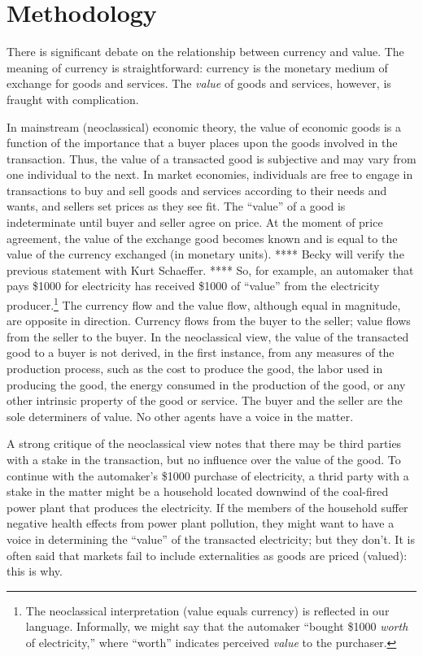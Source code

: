 \section{Methodology}

There is significant debate on the relationship between currency and value. 
The meaning of currency is straightforward: currency is the 
monetary medium of exchange for goods and services. 
The \emph{value} of goods and services, however, 
is fraught with complication.

In mainstream (neoclassical) economic theory,
the value of economic goods is a function of
the importance that a buyer places upon the goods 
involved in the transaction.
Thus, the value of a transacted good is subjective and may 
vary from one individual to the next. 
In market economies, individuals are free to engage in transactions to buy
and sell goods and services according to their needs and wants, 
and sellers set prices as they see fit. 
The ``value'' of a good is indeterminate 
until buyer and seller agree on price.
At the moment of price agreement, 
the value of the exchange good 
becomes known and is equal to 
the value of the currency exchanged
(in monetary units). 
**** Becky will verify the previous statement with Kurt Schaeffer. ****
So, for example, an automaker that pays \$1000 for electricity has received
\$1000 of ``value'' from the electricity producer.\footnote{The neoclassical 
interpretation (value equals currency) 
is reflected in our language. 
Informally, we might say that the automaker 
``bought \$1000 \emph{worth} of electricity,'' 
where ``worth'' indicates perceived 
\emph{value} to the purchaser.}
The currency flow and the value flow, 
although equal in magnitude, are opposite in direction. 
Currency flows from the buyer to the seller;
value flows from the seller to the buyer.
In the neoclassical view, the value 
of the transacted good to a buyer is not derived, 
in the first instance, from any measures of the production process,
such as the cost to produce the good, 
the labor used in producing the good,
the energy consumed in the production of the good,
or any other intrinsic property of the good or service.
The buyer and the seller are the sole determiners of value. 
No other agents have a voice in the matter. 

A strong critique of the neoclassical view notes that
there may be third parties with a stake in the transaction,
but no influence over the value of the good.
To continue with the automaker's \$1000 purchase of electricity,
a thrid party with a stake in the matter might be
a household located downwind of the coal-fired 
power plant that produces the electricity.
If the members of the household suffer negative health effects 
from power plant pollution, 
they might want to have a voice in determining the ``value'' of 
the transacted electricity; but they don't. 
It is often said that markets fail to include externalities
as goods are priced (valued): this is why.

